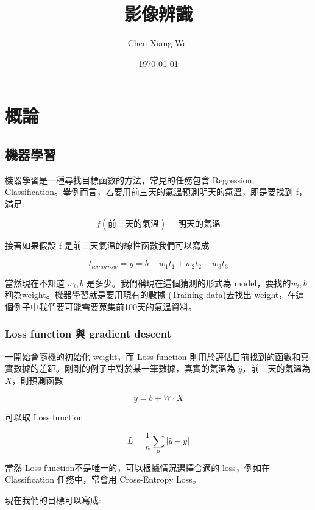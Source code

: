 \RaggedRight
\setlength{\parindent}{2em} %
\newpage

\title{影像辨識} %
\author{Chen Xiang-Wei} %

\date{\today}%
\date{\ROCtoday}%
\maketitle
\thispagestyle{fancy}
\raggedright
{}



\section{概論}

\subsection{機器學習}

機器學習是一種尋找目標函數的方法，常見的任務包含 Regression, Classification。舉例而言，若要用前三天的氣溫預測明天的氣溫，即是要找到 f，滿足: 

$$
f(\mbox{前三天的氣溫}) = \mbox{明天的氣溫}
$$

接著如果假設 f 是前三天氣溫的線性函數我們可以寫成

$$
t_{tomorrow}=y= b + w_1t_1+w_2t_2+w_3t_3
$$

當然現在不知道 $w_i, b$ 是多少。我們稱現在這個猜測的形式為 model，要找的$w_i, b$ 稱為weight。機器學習就是要用現有的數據 (Training data)去找出 weight，在這個例子中我們要可能需要蒐集前100天的氣溫資料。

\subsubsection*{Loss function 與 gradient descent}
一開始會隨機的初始化 weight，而 Loss function 則用於評估目前找到的函數和真實數據的差距。剛剛的例子中對於某一筆數據，真實的氣溫為 $\hat{y}$，前三天的氣溫為$X$，則預測函數 

$$
y= b + W\cdot X
$$
 
可以取 Loss function

$$
L = \frac{1}{n}\sum_{n} |\hat{y}-y|
$$

當然 Loss function不是唯一的，可以根據情況選擇合適的 loss，例如在 Classification 任務中，常會用 Cross-Entropy Loss。 

現在我們的目標可以寫成:

